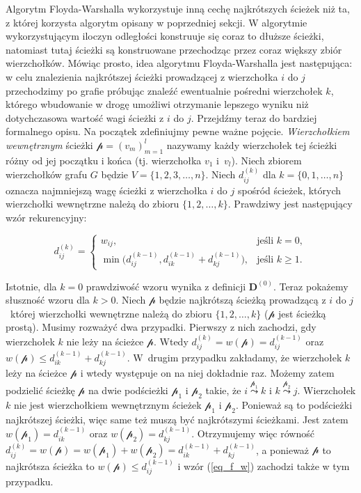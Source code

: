 \documentclass[12pt,a4paper]{book}
\theoremstyle{definition}
\newcommand{\p}{{\mathcal p}}
\numberwithin{equation}{chapter}
\begin{document}
Algorytm Floyda-Warshalla wykorzystuje inną cechę najkrótszych ścieżek niż ta, z której korzysta algorytm opisany w poprzedniej sekcji. W algorytmie wykorzystującym iloczyn odległości konstruuje się coraz to dłuższe ścieżki, natomiast tutaj ścieżki są konstruowane przechodząc przez coraz większy zbiór wierzchołków. Mówiąc prosto, idea algorytmu Floyda-Warshalla jest następująca: w celu znalezienia najkrótszej ścieżki prowadzącej z wierzchołka $i$ do $j$ przechodzimy po grafie próbując znaleźć ewentualnie pośredni wierzchołek $k$, którego wbudowanie w drogę umożliwi otrzymanie lepszego wyniku niż dotychczasowa wartość wagi ścieżki z $i$ do $j$. Przejdźmy teraz do bardziej formalnego opisu. Na początek zdefiniujmy pewne ważne pojęcie. \textit{Wierzchołkiem wewnętrznym} ścieżki  $\p = (v_m)_{m=1}^{l}$ nazywamy każdy wierzchołek tej ścieżki różny od jej początku i końca (tj. wierzchołka $v_1$ i~$v_{l}$). Niech zbiorem wierzchołków grafu $G$ będzie $V = \{1,2,3,\dots, n\}$. Niech $d_{i j}^{(k)}$ dla $k = \{0,1,\dots, n\}$ oznacza najmniejszą wagę ścieżki z wierzchołka $i$ do $j$ spośród ścieżek, których wierzchołki wewnętrzne należą do zbioru $\{1,2,\dots, k\}$. Prawdziwy jest następujący wzór rekurencyjny:

\begin{equation}
\label{eq_f_w}
 d_{i j}^{(k)} = 
  \begin{cases} 
   w_{i j}, & \text{jeśli } k = 0, \\
   \min\big(d_{i j}^{(k-1)}, d_{i k}^{(k-1)} + d_{k j}^{(k-1)}\big), & \text{jeśli } k \geq 1.
  \end{cases}
\end{equation}

Istotnie, dla $k=0$ prawdziwość wzoru wynika z definicji $\mathbf{D}^{(0)}$. Teraz pokażemy słuszność wzoru dla $k>0$. Niech $\p$ będzie najkrótszą ścieżką prowadzącą z $i$ do $j$~której wierzchołki wewnętrzne należą do zbioru $\{1,2,\dots, k\}$ ($\p$ jest ścieżką prostą). Musimy rozważyć dwa przypadki.
Pierwszy z nich zachodzi, gdy wierzchołek $k$ nie leży na ścieżce $\p$. Wtedy $d_{i j}^{(k)} = w(\p) = d_{i j}^{(k-1)}$ oraz $w(\p)\leq d_{i k}^{(k-1)} + d_{k j}^{(k-1)}$. W~drugim przypadku zakładamy, że wierzchołek $k$ leży na ścieżce $\p$ i wtedy występuje on na niej dokładnie raz. Możemy zatem podzielić ścieżkę $\p$ na dwie podścieżki $\p_1$ i $\p_2$ takie, że $i\stackrel{\p_1}{\leadsto}k$ i $k\stackrel{\p_2}{\leadsto}j$. Wierzchołek $k$ nie jest wierzchołkiem wewnętrznym ścieżek $\p_1$ i $\p_2$. Ponieważ są to podścieżki najkrótszej ścieżki, więc same też muszą być najkrótszymi ścieżkami. Jest zatem $w(\p_1) = d_{i k}^{(k-1)}$ oraz $w(\p_2) = d_{k j}^{(k-1)}$. Otrzymujemy więc równość $d_{ij}^{(k)} = w(\p) = w(\p_1)  + w(\p_2)  = d_{i k}^{(k-1)}+ d_{k j}^{(k-1)}$, a ponieważ $\p$ to najkrótsza ścieżka to $w(\p)\leq d_{i j}^{(k-1)}$ i wzór (\ref{eq_f_w}) zachodzi także w tym przypadku.
\end{document}
